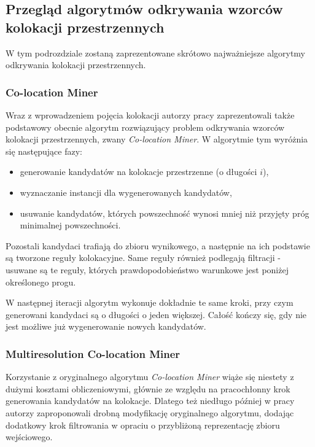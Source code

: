 \documentclass[12pt]{article}
\newcounter{algorytm}
\begin{document}
\subsection{Przegląd algorytmów odkrywania wzorców kolokacji przestrzennych}

W tym podrozdziale zostaną zaprezentowane skrótowo najważniejsze algorytmy odkrywania kolokacji przestrzennych. 

\subsubsection{Co-location Miner}
\label{subsec:clm}

Wraz z wprowadzeniem pojęcia kolokacji autorzy pracy \cite{huang} zaprezentowali także podstawowy obecnie algorytm rozwiązujący problem odkrywania wzorców kolokacji przestrzennych, zwany \textit{Co-location Miner}. W algorytmie tym wyróżnia się następujące fazy:

\begin{itemize}
\item generowanie kandydatów na kolokacje przestrzenne (o długości $i$),
\item wyznaczanie instancji dla wygenerowanych kandydatów,
\item usuwanie kandydatów, których powszechność wynosi mniej niż przyjęty próg minimalnej powszechności.
\end{itemize}

Pozostali kandydaci trafiają do zbioru wynikowego, a następnie na ich podstawie są tworzone reguły kolokacyjne. Same reguły również podlegają filtracji - usuwane są te reguły, których prawdopodobieństwo warunkowe jest poniżej określonego progu. 

W następnej iteracji algorytm wykonuje dokładnie te same kroki, przy czym generowani kandydaci są o długości o jeden większej. Całość kończy się, gdy nie jest możliwe już wygenerowanie nowych kandydatów.

\subsubsection{Multiresolution Co-location Miner}

Korzystanie z oryginalnego algorytmu \textit{Co-location Miner} wiąże się niestety z dużymi kosztami obliczeniowymi, głównie ze względu na pracochłonny krok generowania kandydatów na kolokacje. Dlatego też niedługo później w pracy \cite{multihuang} autorzy zaproponowali drobną modyfikację oryginalnego algorytmu, dodając dodatkowy krok filtrowania w opraciu o przybliżoną reprezentację zbioru wejściowego.
\end{document}

